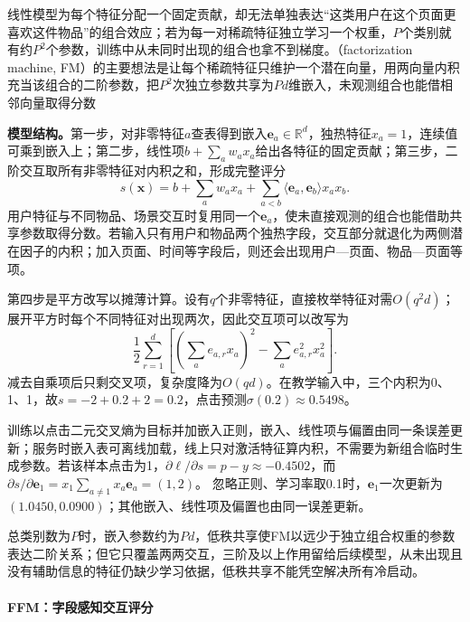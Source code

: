 线性模型为每个特征分配一个固定贡献，却无法单独表达“这类用户在这个页面更喜欢这件物品”的组合效应；若为每一对稀疏特征独立学习一个权重，$P$个类别就有约$P^2$个参数，训练中从未同时出现的组合也拿不到梯度。（factorization machine, FM）的主要想法是让每个稀疏特征只维护一个潜在向量，用两向量内积充当该组合的二阶参数，把$P^2$次独立参数共享为$Pd$维嵌入，未观测组合也能借相邻向量取得分数

\textbf{模型结构。}第一步，对非零特征$a$查表得到嵌入$\bm e_a\in\mathbb R^d$，独热特征$x_a=1$，连续值可乘到嵌入上；第二步，线性项$b+\sum_a w_ax_a$给出各特征的固定贡献；第三步，二阶交互取所有非零特征对内积之和，形成完整评分
\begin{equation}
 s(\bm x)=b+\sum_a w_ax_a+
       \sum_{a<b}\langle\bm e_a,\bm e_b\rangle x_ax_b.
 \label{eq:rs-fm}
\end{equation}
用户特征与不同物品、场景交互时复用同一个$\bm e_a$，使未直接观测的组合也能借助共享参数取得分数。若输入只有用户和物品两个独热字段，交互部分就退化为两侧潜在因子的内积；加入页面、时间等字段后，则还会出现用户—页面、物品—页面等项。

第四步是平方改写以摊薄计算。设有$q$个非零特征，直接枚举特征对需$O(q^2d)$；展开平方时每个不同特征对出现两次，因此交互项可以改写为
\begin{equation}
 \frac12\sum_{r=1}^{d}
 \left[\left(\sum_a e_{a,r}x_a\right)^2
       -\sum_a e_{a,r}^2x_a^2\right].
 \label{eq:rs-fm-linear}
\end{equation}
减去自乘项后只剩交叉项，复杂度降为$O(qd)$。在教学输入中，三个内积为0、1、1，故$s=-2+0.2+2=0.2$，点击预测$\sigma(0.2)\approx0.5498$。

训练以点击二元交叉熵为目标并加嵌入正则，嵌入、线性项与偏置由同一条误差更新；服务时嵌入表可离线加载，线上只对激活特征算内积，不需要为新组合临时生成参数。若该样本点击为1，$\partial\ell/\partial s=p-y\approx-0.4502$，而
$\partial s/\partial\bm e_1=x_1\sum_{a\ne1}x_a\bm e_a=(1,2)$。
忽略正则、学习率取0.1时，$\bm e_1$一次更新为$(1.0450,0.0900)$；其他嵌入、线性项及偏置也由同一误差更新。

总类别数为$P$时，嵌入参数约为$Pd$，低秩共享使FM以远少于独立组合权重的参数表达二阶关系；但它只覆盖两两交互，三阶及以上作用留给后续模型，从未出现且没有辅助信息的特征仍缺少学习依据，低秩共享不能凭空解决所有冷启动。

\paragraph{FFM：字段感知交互评分}
\label{sec:rs-ffm}


